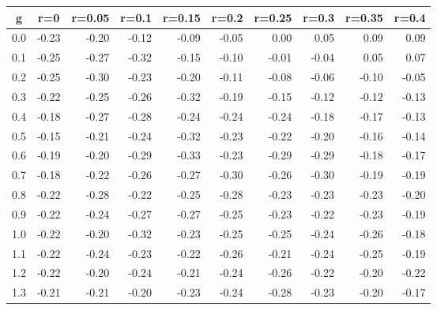 %
\begin{table}[!tbp]
 \begin{center}
 \begin{tabular}{rrrrrrrrrr}\hline\hline
\multicolumn{1}{c}{g}&\multicolumn{1}{c}{r=0}&\multicolumn{1}{c}{r=0.05}&\multicolumn{1}{c}{r=0.1}&\multicolumn{1}{c}{r=0.15}&\multicolumn{1}{c}{r=0.2}&\multicolumn{1}{c}{r=0.25}&\multicolumn{1}{c}{r=0.3}&\multicolumn{1}{c}{r=0.35}&\multicolumn{1}{c}{r=0.4}\tabularnewline
\hline
0.0&-0.23&-0.20&-0.12&-0.09&-0.05& 0.00& 0.05& 0.09& 0.09\tabularnewline
0.1&-0.25&-0.27&-0.32&-0.15&-0.10&-0.01&-0.04& 0.05& 0.07\tabularnewline
0.2&-0.25&-0.30&-0.23&-0.20&-0.11&-0.08&-0.06&-0.10&-0.05\tabularnewline
0.3&-0.22&-0.25&-0.26&-0.32&-0.19&-0.15&-0.12&-0.12&-0.13\tabularnewline
0.4&-0.18&-0.27&-0.28&-0.24&-0.24&-0.24&-0.18&-0.17&-0.13\tabularnewline
0.5&-0.15&-0.21&-0.24&-0.32&-0.23&-0.22&-0.20&-0.16&-0.14\tabularnewline
0.6&-0.19&-0.20&-0.29&-0.33&-0.23&-0.29&-0.29&-0.18&-0.17\tabularnewline
0.7&-0.18&-0.22&-0.26&-0.27&-0.30&-0.26&-0.30&-0.19&-0.19\tabularnewline
0.8&-0.22&-0.28&-0.22&-0.25&-0.28&-0.23&-0.23&-0.23&-0.20\tabularnewline
0.9&-0.22&-0.24&-0.27&-0.27&-0.25&-0.23&-0.22&-0.23&-0.19\tabularnewline
1.0&-0.22&-0.20&-0.32&-0.23&-0.25&-0.25&-0.24&-0.26&-0.18\tabularnewline
1.1&-0.22&-0.24&-0.23&-0.22&-0.26&-0.21&-0.24&-0.25&-0.19\tabularnewline
1.2&-0.22&-0.20&-0.24&-0.21&-0.24&-0.26&-0.22&-0.20&-0.22\tabularnewline
1.3&-0.21&-0.21&-0.20&-0.23&-0.24&-0.28&-0.23&-0.20&-0.17\tabularnewline
\hline
\end{tabular}

\end{center}

\end{table}

